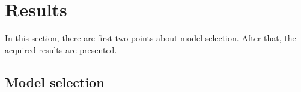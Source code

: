 \section{Results}
\label{sec:results}

In this section, there are first two points about model selection. After that, the acquired results are presented.\\


\subsection*{Model selection}

